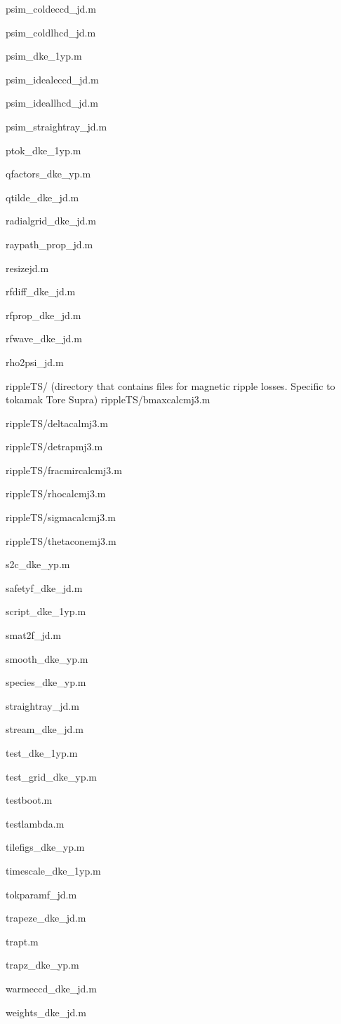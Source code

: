\begin{itemize}
psim\_coldeccd\_jd.m

psim\_coldlhcd\_jd.m

psim\_dke\_1yp.m

psim\_idealeccd\_jd.m

psim\_ideallhcd\_jd.m

psim\_straightray\_jd.m

ptok\_dke\_1yp.m

qfactors\_dke\_yp.m

qtilde\_dke\_jd.m

radialgrid\_dke\_jd.m

raypath\_prop\_jd.m

resizejd.m

rfdiff\_dke\_jd.m

rfprop\_dke\_jd.m

rfwave\_dke\_jd.m

rho2psi\_jd.m

rippleTS/ (directory that contains files for magnetic ripple losses.
Specific to tokamak Tore Supra)
rippleTS/bmaxcalcmj3.m

rippleTS/deltacalmj3.m

rippleTS/detrapmj3.m

rippleTS/fracmircalcmj3.m

rippleTS/rhocalcmj3.m

rippleTS/sigmacalcmj3.m

rippleTS/thetaconemj3.m

s2c\_dke\_yp.m

safetyf\_dke\_jd.m

script\_dke\_1yp.m

smat2f\_jd.m

smooth\_dke\_yp.m

species\_dke\_yp.m

straightray\_jd.m

stream\_dke\_jd.m

test\_dke\_1yp.m

test\_grid\_dke\_yp.m

testboot.m

testlambda.m

tilefigs\_dke\_yp.m

timescale\_dke\_1yp.m

tokparamf\_jd.m

trapeze\_dke\_jd.m

trapt.m

trapz\_dke\_yp.m

warmeccd\_dke\_jd.m

weights\_dke\_jd.m

\end{itemize}
